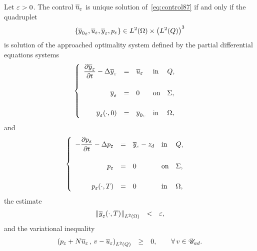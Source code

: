 \begin{theoreme}\label{thm:soapproche}%
    Let $\varepsilon > 0$. The control ${\overline{u}}_{\varepsilon}$ is unique solution
    of~\eqref{eq:control87} if and only if the quadruplet
    \begin{equation*}
        \left\{{%
            {\bar{y}_{0}}_{\veps}, \bareps{u}, \bareps{y}, p_{\veps}
        }\right\}\in \Ldeux{\Omega}\times {\left({\Ldeux{Q}}\right)}^{3}
    \end{equation*}
    is solution of the approached optimality system defined by the partial
    differential equations systems
    \begin{equation}
        \begin{cases}\displaystyle
            \begin{array}{rclll}
                \dfrac{\partial{}{\overline{y}}_{\varepsilon}}{\partial{}t} - \Delta{\overline{y}}_{\varepsilon} & = & {\overline{u}}_{\varepsilon}
                & \text{in} & Q,\\
                \\
                {\overline{y}}_{\varepsilon} & = & 0 & \text{on} & \Sigma,\\
                \\
                {{\overline{y}}_{\varepsilon}}\!\left({\cdot, 0}\right) & = & {\overline{y}_{0}}_{\varepsilon} &
                \text{in} & \Omega,
            \end{array}
        \end{cases}
    \end{equation}
    and
    \begin{equation}\label{eq:control130}
        \begin{cases}\displaystyle
            \begin{array}{rclll}
                -\dfrac{\partial{}p_{\varepsilon}}{\partial{}t} - \Delta p_{\varepsilon} & = & {\overline{y}}_{\varepsilon}
                - z_{d} & \text{in} & Q,\\
                \\
                p_{\varepsilon} & = & 0 & \text{on} & \Sigma,\\
                \\
                {p_{\varepsilon}}\!\left({\cdot,T}\right) & = & 0 & \text{in} & \Omega,
            \end{array}
        \end{cases}
    \end{equation}
    the estimate
    \begin{equation}
        \begin{array}{rcl}
            \normeohm{%
                \condfinale{\bareps{y}}
            } & < & \veps,
        \end{array}
    \end{equation}
    and the variational inequality
    \begin{equation}
        \begin{array}{rcl}
            \scalaireq{%
                p_{\veps} + N\bareps{u}
            }{%
                v - \bareps{u}
            } & \geq & 0,\qquad \forall\,v\in\uad.
        \end{array}
    \end{equation}
\end{theoreme}

